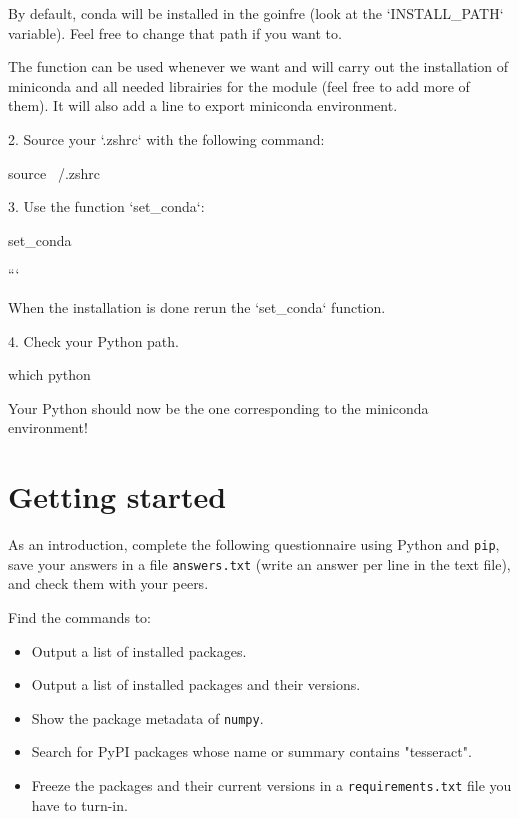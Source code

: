 \documentclass{42-en}
\begin{document}
By default, conda will be installed in the goinfre (look at the `INSTALL_PATH` variable). Feel free to change that path if you want to.

The function can be used whenever we want and will carry out the installation of miniconda and all needed librairies for the module (feel free to add more of them). It will also add a line to export miniconda environment.

2. Source your `.zshrc` with the following command:

\begin{42console}
source ~/.zshrc
\end{42console}


3. Use the function `set_conda`:

\begin{42console}
set_conda
\end{42console}
```

When the installation is done rerun the `set_conda` function.

4. Check your Python path.

\begin{42console}
which python
\end{42console}

Your Python should now be the one corresponding to the miniconda environment!


\newpage
\section*{Getting started}

As an introduction, complete the following questionnaire using Python and \texttt{pip}, save your answers in a file \texttt{answers.txt} (write an answer per line in the text file), and check them with your peers.

Find the commands to:
\begin{itemize}\itemsep7pt
	\item Output a list of installed packages.
	\item Output a list of installed packages and their versions.
	\item Show the package metadata of \texttt{numpy}.
	\item Search for PyPI packages whose name or summary contains "tesseract".
	\item Freeze the packages and their current versions in a \texttt{requirements.txt} file you have to turn-in.
\end{itemize}
\end{document}
